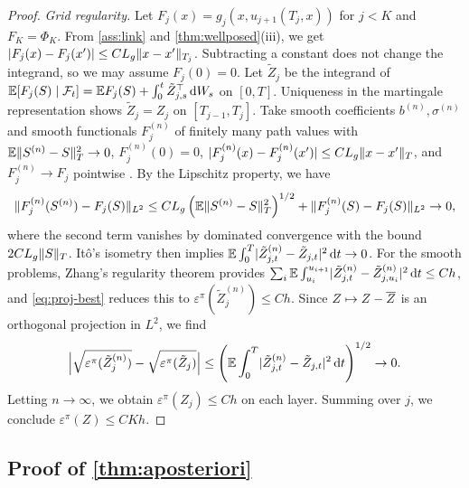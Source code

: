 \begin{proof}
\emph{Grid regularity.} Let $F_j(x)=g_j(x,u_{j+1}(T_j,x))$ for $j<K$ and $F_K=\Phi_K$. From \cref{ass:link} and \cref{thm:wellposed}(iii), we get $\lvert F_j(x)-F_j(x')\rvert\le CL_g\lVert x-x'\rVert_{T_j}$. Subtracting a constant does not change the integrand, so we may assume $F_j(0)=0$. Let $\tilde Z_j$ be the integrand of $\mathbb{E}[F_j(S)\mid\mathcal{F}_t]=\mathbb{E} F_j(S)+\int_0^t\tilde Z_{j,s}^\top\,\mathrm{d} W_s$ on $[0,T]$. Uniqueness in the martingale representation shows $\tilde Z_j=Z_j$ on $[T_{j-1},T_j]$. Take smooth coefficients $b^{(n)},\sigma^{(n)}$ and smooth functionals $F^{(n)}_j$ of finitely many path values with $\mathbb{E}\lVert S^{(n)}-S\rVert_T^2\to0$, $F_j^{(n)}(0)=0$, $\lvert F_j^{(n)}(x)-F_j^{(n)}(x')\rvert\le CL_g\lVert x-x'\rVert_T$, and $F_j^{(n)}\to F_j$ pointwise \cite{zhang2004}. By the Lipschitz property, we have
\[
\lVert F_j^{(n)}(S^{(n)})-F_j(S)\rVert_{L^2}\le CL_g\left(\mathbb{E}\lVert S^{(n)}-S\rVert_T^2\right)^{1/2}+\lVert F_j^{(n)}(S)-F_j(S)\rVert_{L^2}\to0,
\]
where the second term vanishes by dominated convergence with the bound $2CL_g\lVert S\rVert_T$. It\^o's isometry then implies $\mathbb{E}\int_0^T\lvert \tilde Z^{(n)}_{j,t}-\tilde Z_{j,t}\rvert^2\,\mathrm{d} t\to0$. For the smooth problems, Zhang's regularity theorem \cite{zhang2004} provides $\sum_i\mathbb{E}\int_{u_i}^{u_{i+1}}\lvert \tilde Z^{(n)}_{j,t}-\tilde Z^{(n)}_{j,u_i}\rvert^2\,\mathrm{d} t\le Ch$, and \eqref{eq:proj-best} reduces this to $\varepsilon^\pi(\tilde Z^{(n)}_j)\le Ch$. Since $Z\mapsto Z-\overline Z$ is an orthogonal projection in $L^2$, we find
\[
\Bigl\lvert\sqrt{\varepsilon^\pi(\tilde Z^{(n)}_j)}-\sqrt{\varepsilon^\pi(\tilde Z_j)}\Bigr\rvert\le\left(\mathbb{E}\int_0^T\lvert \tilde Z^{(n)}_{j,t}-\tilde Z_{j,t}\rvert^2\,\mathrm{d} t\right)^{1/2}\to0 .
\]
Letting $n\to\infty$, we obtain $\varepsilon^\pi(Z_j)\le Ch$ on each layer. Summing over $j$, we conclude $\varepsilon^\pi(Z)\le CKh$.
\end{proof}

\subsection{Proof of \texorpdfstring{\cref{thm:aposteriori}}{Theorem 5}}\label{app:aposteriori}

